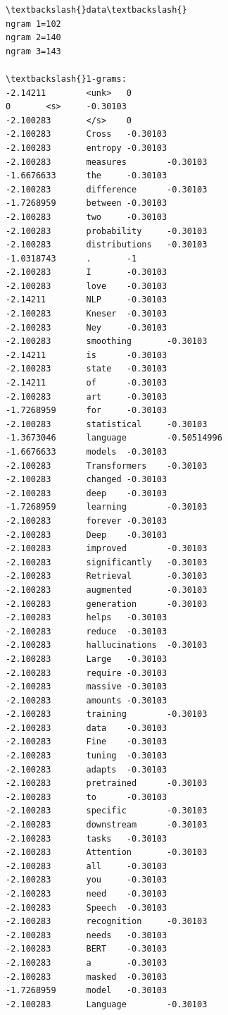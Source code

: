 \documentclass[11pt]{article}
\begin{document}
    \begin{Verbatim}[commandchars=\\\{\}]
\textbackslash{}data\textbackslash{}
ngram 1=102
ngram 2=140
ngram 3=143

\textbackslash{}1-grams:
-2.14211        <unk>   0
0       <s>     -0.30103
-2.100283       </s>    0
-2.100283       Cross   -0.30103
-2.100283       entropy -0.30103
-2.100283       measures        -0.30103
-1.6676633      the     -0.30103
-2.100283       difference      -0.30103
-1.7268959      between -0.30103
-2.100283       two     -0.30103
-2.100283       probability     -0.30103
-2.100283       distributions   -0.30103
-1.0318743      .       -1
-2.100283       I       -0.30103
-2.100283       love    -0.30103
-2.14211        NLP     -0.30103
-2.100283       Kneser  -0.30103
-2.100283       Ney     -0.30103
-2.100283       smoothing       -0.30103
-2.14211        is      -0.30103
-2.100283       state   -0.30103
-2.14211        of      -0.30103
-2.100283       art     -0.30103
-1.7268959      for     -0.30103
-2.100283       statistical     -0.30103
-1.3673046      language        -0.50514996
-1.6676633      models  -0.30103
-2.100283       Transformers    -0.30103
-2.100283       changed -0.30103
-2.100283       deep    -0.30103
-1.7268959      learning        -0.30103
-2.100283       forever -0.30103
-2.100283       Deep    -0.30103
-2.100283       improved        -0.30103
-2.100283       significantly   -0.30103
-2.100283       Retrieval       -0.30103
-2.100283       augmented       -0.30103
-2.100283       generation      -0.30103
-2.100283       helps   -0.30103
-2.100283       reduce  -0.30103
-2.100283       hallucinations  -0.30103
-2.100283       Large   -0.30103
-2.100283       require -0.30103
-2.100283       massive -0.30103
-2.100283       amounts -0.30103
-2.100283       training        -0.30103
-2.100283       data    -0.30103
-2.100283       Fine    -0.30103
-2.100283       tuning  -0.30103
-2.100283       adapts  -0.30103
-2.100283       pretrained      -0.30103
-2.100283       to      -0.30103
-2.100283       specific        -0.30103
-2.100283       downstream      -0.30103
-2.100283       tasks   -0.30103
-2.100283       Attention       -0.30103
-2.100283       all     -0.30103
-2.100283       you     -0.30103
-2.100283       need    -0.30103
-2.100283       Speech  -0.30103
-2.100283       recognition     -0.30103
-2.100283       needs   -0.30103
-2.100283       BERT    -0.30103
-2.100283       a       -0.30103
-2.100283       masked  -0.30103
-1.7268959      model   -0.30103
-2.100283       Language        -0.30103

\end{Verbatim}
\end{document}
